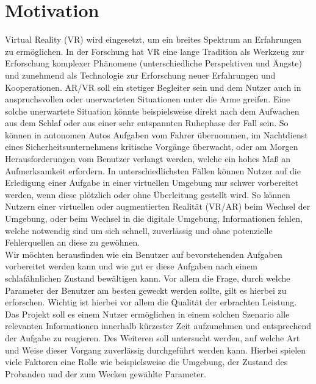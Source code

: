 \section{Motivation}

Virtual Reality (VR) wird eingesetzt, um ein breites Spektrum an Erfahrungen zu ermöglichen. In der Forschung hat VR eine lange Tradition als Werkzeug zur Erforschung komplexer Phänomene (unterschiedliche Perspektiven und Ängste) und zunehmend als Technologie zur Erforschung neuer Erfahrungen und Kooperationen.
AR/VR soll ein stetiger Begleiter sein und dem Nutzer auch in anspruchsvollen oder unerwarteten Situationen unter die Arme greifen.
Eine solche unerwartete Situation könnte beispielsweise direkt nach dem Aufwachen aus dem Schlaf oder aus einer sehr entspannten Ruhephase der Fall sein. So können in autonomen Autos Aufgaben vom Fahrer übernommen, im Nachtdienst eines Sicherheitsunternehmens kritische Vorgänge überwacht, oder am Morgen Herausforderungen vom Benutzer verlangt werden, welche ein hohes Maß an Aufmerksamkeit erfordern. 
In unterschiedlichsten Fällen können Nutzer auf die Erledigung einer Aufgabe in einer virtuellen Umgebung nur schwer vorbereitet werden, wenn diese plötzlich oder ohne Überleitung gestellt wird.
So können Nutzern einer virtuellen oder augmentierten Realität (VR/AR) beim Wechsel der Umgebung, oder beim Wechsel in die digitale Umgebung, Informationen fehlen, welche notwendig sind um sich schnell, zuverlässig und ohne potenzielle Fehlerquellen an diese zu gewöhnen.\\
Wir möchten herausfinden wie ein Benutzer auf bevorstehenden Aufgaben vorbereitet werden kann und wie gut er diese Aufgaben nach einem schlafähnlichen Zustand bewältigen kann. Vor allem die Frage, durch welche Parameter der Benutzer am besten geweckt werden sollte, gilt es hierbei zu erforschen. Wichtig ist hierbei vor allem die Qualität der erbrachten Leistung.\\
Das Projekt \projectName soll es einem Nutzer ermöglichen in einem solchen Szenario alle relevanten Informationen innerhalb kürzester Zeit aufzunehmen und entsprechend der Aufgabe zu reagieren. Des Weiteren soll untersucht werden, auf welche Art und Weise dieser Vorgang zuverlässig durchgeführt werden kann. Hierbei spielen viele Faktoren eine Rolle wie beispielsweise die Umgebung, der Zustand des Probanden und der zum Wecken gewählte Parameter.\\
